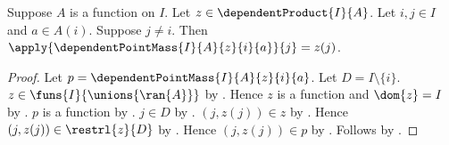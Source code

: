 \begin{proposition}\label{dependent_point_mass_other}
    Suppose $A$ is a function on $I$.
    Let $z\in\dependentProduct{I}{A}$.
    Let $i,j\in I$ and $a\in A(i)$.
    Suppose $j\neq i$.
    Then $\apply{\dependentPointMass{I}{A}{z}{i}{a}}{j}=z(j)$.
\end{proposition}
\begin{proof}
    Let $p=\dependentPointMass{I}{A}{z}{i}{a}$.
    Let $D=I\setminus\{i\}$.
    $z\in\funs{I}{\unions{\ran{A}}}$ by
        .
    Hence $z$ is a function and $\dom{z}=I$ by
        .
    $p$ is a function by
        .
    $j\in D$ by .
    $(j,z(j))\in z$ by .
    Hence $(j,z(j))\in\restrl{z}{D}$ by .
    Hence $(j,z(j))\in p$ by
        .
    Follows by .
\end{proof}

